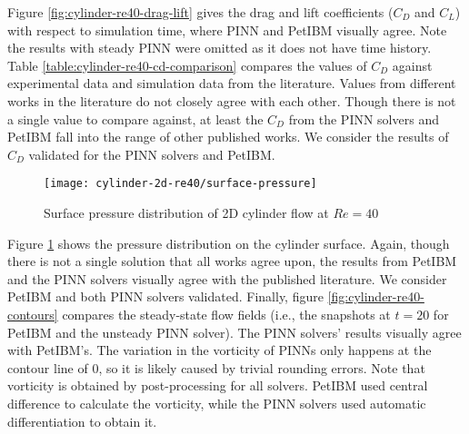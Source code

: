 Figure \ref{fig:cylinder-re40-drag-lift} gives the drag and lift coefficients ($C_D$ and $C_L$) with respect to simulation time, where PINN and PetIBM visually agree.
Note the results with steady PINN were omitted as it does not have time history.
Table \ref{table:cylinder-re40-cd-comparison} compares the values of $C_D$ against experimental data and simulation data from the literature.
Values from different works in the literature do not closely agree with each other.
Though there is not a single value to compare against, at least the $C_D$ from the PINN solvers and PetIBM fall into the range of other published works.
We consider the results of $C_D$ validated for the PINN solvers and PetIBM.


\begin{figure}
    \centering%
    \texttt{[image: cylinder-2d-re40/surface-pressure]}%
    \caption{%
        Surface pressure distribution of 2D cylinder flow at $Re=\num{40}$
    }
    \label{fig:cylinder-re40-pinn-surfp}%
\end{figure}

Figure \ref{fig:cylinder-re40-pinn-surfp} shows the pressure distribution on the cylinder surface.
Again, though there is not a single solution that all works agree upon, the results from PetIBM and the PINN solvers visually agree with the published literature.
We consider PetIBM and both PINN solvers validated.
Finally, figure \ref{fig:cylinder-re40-contours} compares the steady-state flow fields (i.e., the snapshots at $t=20$ for PetIBM and the unsteady PINN solver).
The PINN solvers' results visually agree with PetIBM's.
The variation in the vorticity of PINNs only happens at the contour line of \num{0}, so it is likely caused by trivial rounding errors.
Note that vorticity is obtained by post-processing for all solvers.
PetIBM used central difference to calculate the vorticity, while the PINN solvers used automatic differentiation to obtain it.


